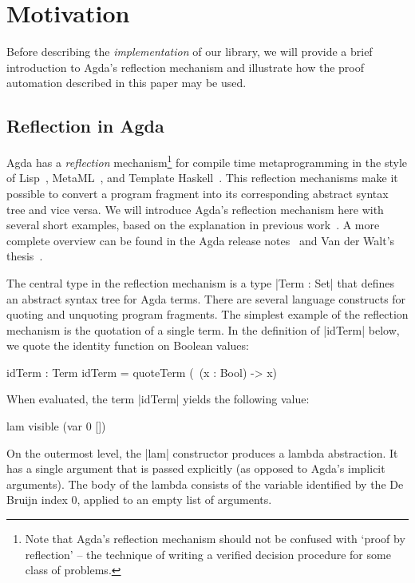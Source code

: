 \documentclass[preprint]{sigplanconf}
\begin{document}
\section{Motivation}
\label{sec:motivation}

Before describing the \emph{implementation} of our library, we will
provide a brief introduction to Agda's reflection mechanism and
illustrate how the proof automation described in this paper may be
used.

\subsection*{Reflection in Agda}

Agda has a \emph{reflection} mechanism\footnote{Note that Agda's
  reflection mechanism should not be confused with `proof by
  reflection' -- the technique of writing a verified decision
  procedure for some class of problems.} for compile time
metaprogramming in the style of Lisp~\cite{lisp-macros},
MetaML~\cite{metaml}, and Template
Haskell~\cite{template-haskell}. This reflection mechanisms make it
possible to convert a program fragment into its corresponding abstract
syntax tree and vice versa. We will introduce Agda's reflection
mechanism here with several short examples, based on the explanation
in previous work~\cite{van-der-walt}. A more complete overview can be
found in the Agda release notes~\cite{agda-relnotes-228} and Van der
Walt's thesis~\cite{vdWalt:Thesis:2012}.

The central type in the reflection mechanism is a type |Term : Set|
that defines an abstract syntax tree for Agda terms. There are several
language constructs for quoting and unquoting program fragments. The simplest
example of the reflection mechanism is the quotation of a single
term. In the definition of |idTerm| below, we quote the identity
function on Boolean values:
\begin{code}
  idTerm : Term
  idTerm = quoteTerm (\ (x : Bool) -> x)
\end{code}
When evaluated, the term |idTerm| yields the following value:
\begin{code}
  lam visible (var 0 [])
\end{code}
On the outermost level, the |lam| constructor produces a lambda
abstraction. It has a single argument that is passed explicitly (as
opposed to Agda's implicit arguments). The body of the lambda consists
of the variable identified by the De Bruijn index 0, applied to an
empty list of arguments.
\end{document}
